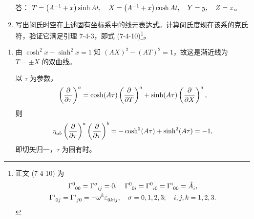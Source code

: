 \begin{xiti}
\begin{enumerate}[label=(\alph*)]
		答： $T=\left( A^{-1} + x \right) \sinh At \qc X= \left( A^{-1} + x \right) \cosh At \qc Y=y \qc Z=z$。

		\item 写出闵氏时空在上述固有坐标系中的线元表达式。计算闵氏度规在该系的克氏符，验证它满足引理 7-4-3，即式 (7-4-10)\footnote{正文 (7-4-10) 为
		\begin{equation*}
			\begin{gathered}
				\ChristoffelSymbol{0}{0}{0} = \ChristoffelSymbol{\sigma}{i}{j} = 0 \qc \ChristoffelSymbol{0}{0}{i} = \ChristoffelSymbol{0}{i}{0} = \ChristoffelSymbol{i}{0}{0} = \tensor{\hat{A}}{_i},\\
				\ChristoffelSymbol{i}{0}{j} = \ChristoffelSymbol{i}{j}{0} = - \tensor{\omega}{^k} \tensor{\varepsilon}{_0_k_i_j} \qc \sigma = 0,1,2,3; \quad i,j,k = 1,2,3.
			\end{gathered}
		\end{equation*}
		}。
	\end{enumerate}

		\begin{zm}
			\begin{enumerate}[label=(\alph*)]
				\item 由 $\cosh^2 x - \sinh^2 x = 1$ 知 $\left( A X \right)^2 - \left( A T \right)^2 = 1$，故这是渐近线为 $T=\pm X$ 的双曲线。
				
				以 $\tau$ 为参数，
				\begin{equation*}
					\tensor{\left( \pdv{\tau} \right)}{^a} = \cosh(A\tau) \tensor{\left( \pdv{T} \right)}{^a} + \sinh(A\tau) \tensor{\left( \pdv{X} \right)}{^a},
				\end{equation*}
				则
				\begin{equation*}
					\tensor{\eta}{_a_b} \tensor{\left( \pdv{\tau} \right)}{^a} \tensor{\left( \pdv{\tau} \right)}{^b} = - \cosh[2](A\tau) + \sinh[2](A\tau) = -1,
				\end{equation*}
				即切矢归一，$\tau$ 为固有时。


\end{enumerate}
\end{zm}
\end{xiti}
